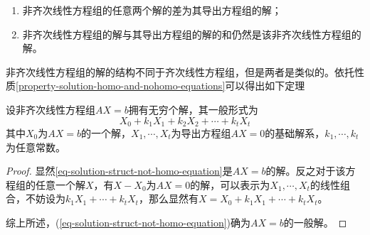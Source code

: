 \begin{property}
    \label{property-solution-homo-and-nohomo-equations}
    \begin{enumerate}
        \item 非齐次线性方程组的任意两个解的差为其导出方程组的解；
        \item 非齐次线性方程组的解与其导出方程组的解的和仍然是该非齐次线性方程组的解。
    \end{enumerate}
\end{property}

非齐次线性方程组的解的结构不同于齐次线性方程组，但是两者是类似的。依托性质\ref{property-solution-homo-and-nohomo-equations}可以得出如下定理

\begin{thm}
    \label{thm-solution-struct-not-homo-equation}
    设非齐次线性方程组$AX=b$拥有无穷个解，其一般形式为
    \begin{equation}
        X_0+k_1X_1+k_2X_2+\cdots+k_tX_t
        \label{eq-solution-struct-not-homo-equation}
    \end{equation}
    其中$X_0$为$AX=b$的一个解，$X_1,\cdots,X_t$为导出方程组$AX=0$的基础解系，$k_1,\cdots,k_t$为任意常数。
\end{thm}

\begin{proof}
    显然\ref{eq-solution-struct-not-homo-equation}是$AX=b$的解。反之对于该方程组的任意一个解$X$，有$X-X_0$为$AX=0$的解，可以表示为$X_1,\cdots,X_t$的线性组合，不妨设为$k_1X_1+\cdots+k_tX_t$，那么显然有$X=X_0+k_1X_1+\cdots+k_tX_t$。

    综上所述，(\ref{eq-solution-struct-not-homo-equation})确为$AX=b$的一般解。
\end{proof}
